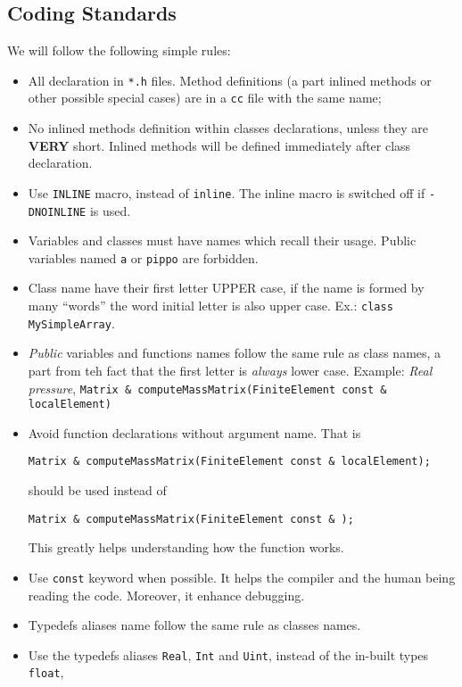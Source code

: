 \subsection{Coding Standards}
We will follow the following simple rules:
\begin{itemize}
\item All declaration in \texttt{*.h} files. Method definitions (a part
  inlined methods or other possible special cases) are in a
  \texttt{cc} file with the same name;
\item No inlined methods definition within classes declarations, unless
they are \textbf{VERY} short. Inlined methods will be defined 
immediately after class declaration.
\item Use \texttt{INLINE} macro, instead of \texttt{inline}. The
  inline macro is switched off if \texttt{-DNOINLINE} is used.
\item Variables and classes must have names which recall their usage.
  Public variables named \texttt{a} or \texttt{pippo} are forbidden.
\item Class name have their first letter UPPER case, if the
    name is formed by many ``words'' the word initial letter is also
    upper case.  Ex.: \texttt{class MySimpleArray}.
\item \emph{Public} variables and functions names follow the same rule
as class names, a part from teh fact that the first letter is \emph{always} lower case. Example: \emph{Real pressure}, \texttt{Matrix \& computeMassMatrix(FiniteElement const \& localElement)}
\item Avoid function declarations without argument name. 
That is
\begin{verbatim}
Matrix & computeMassMatrix(FiniteElement const & localElement);
\end{verbatim}
should be used instead of
\begin{verbatim}
Matrix & computeMassMatrix(FiniteElement const & );
\end{verbatim}                                
This greatly helps understanding how the function works.
\item Use \texttt{const} keyword when possible. It helps the compiler
  and the human being reading the code. Moreover, it enhance
  debugging.
\item Typedefs aliases name follow the same rule as classes names.
\item Use the typedefs aliases \texttt{Real}, \texttt{Int} and
  \texttt{Uint}, instead of the in-built types \texttt{float},

\end{itemize}
